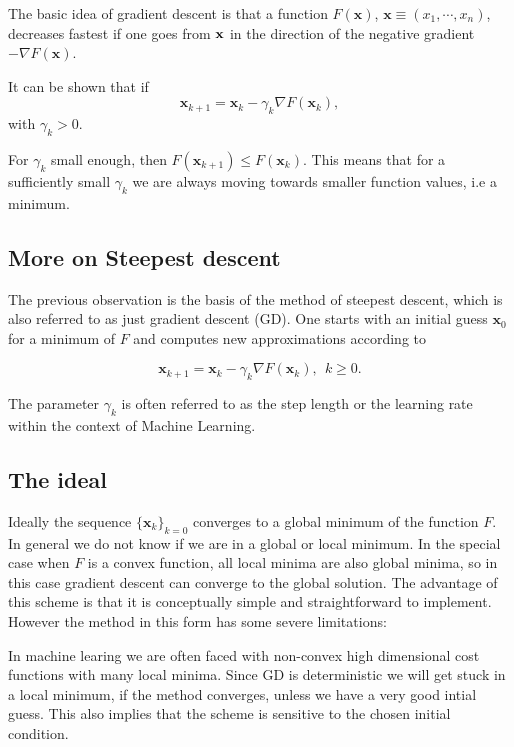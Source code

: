 \documentclass[%
oneside,                 %
final,                   %
10pt]{article}
\begin{document}
The basic idea of gradient descent is
that a function $F(\mathbf{x})$, 
$\mathbf{x} \equiv (x_1,\cdots,x_n)$, decreases fastest if one goes from $\bf {x}$ in the
direction of the negative gradient $-\nabla F(\mathbf{x})$.

It can be shown that if 
\[
\mathbf{x}_{k+1} = \mathbf{x}_k - \gamma_k \nabla F(\mathbf{x}_k),
\]
with $\gamma_k > 0$.

For $\gamma_k$ small enough, then $F(\mathbf{x}_{k+1}) \leq
F(\mathbf{x}_k)$. This means that for a sufficiently small $\gamma_k$
we are always moving towards smaller function values, i.e a minimum.

\subsection*{More on Steepest descent}

The previous observation is the basis of the method of steepest
descent, which is also referred to as just gradient descent (GD). One
starts with an initial guess $\mathbf{x}_0$ for a minimum of $F$ and
computes new approximations according to

\[
\mathbf{x}_{k+1} = \mathbf{x}_k - \gamma_k \nabla F(\mathbf{x}_k), \ \ k \geq 0.
\]

The parameter $\gamma_k$ is often referred to as the step length or
the learning rate within the context of Machine Learning.

\subsection*{The ideal}

Ideally the sequence $\{\mathbf{x}_k \}_{k=0}$ converges to a global
minimum of the function $F$. In general we do not know if we are in a
global or local minimum. In the special case when $F$ is a convex
function, all local minima are also global minima, so in this case
gradient descent can converge to the global solution. The advantage of
this scheme is that it is conceptually simple and straightforward to
implement. However the method in this form has some severe
limitations:

In machine learing we are often faced with non-convex high dimensional
cost functions with many local minima. Since GD is deterministic we
will get stuck in a local minimum, if the method converges, unless we
have a very good intial guess. This also implies that the scheme is
sensitive to the chosen initial condition.
\end{document}
